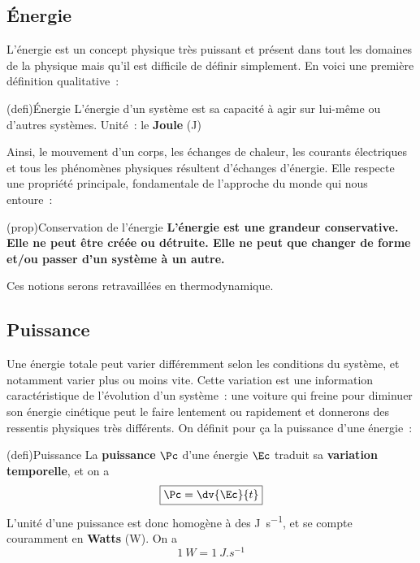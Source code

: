 \documentclass[../../main/main.tex]{subfiles}
\begin{document}
\subsection{Énergie}
L’énergie est un concept physique très puissant et présent dans tout les
domaines de la physique mais qu’il est difficile de définir simplement. En voici
une première définition qualitative~:
\begin{tcb*}[sidebyside, righthand ratio=.3](defi){Énergie}
	L’énergie d’un système est sa capacité à agir sur lui-même ou d’autres
	systèmes.
	\tcblower
	Unité~: le \textbf{Joule} (J)
\end{tcb*}

Ainsi, le mouvement d'un corps, les échanges de chaleur, les courants
électriques et tous les phénomènes physiques résultent d'échanges d'énergie.
Elle respecte une propriété principale, fondamentale de l'approche du monde qui
nous entoure~:

\begin{tcb*}(prop){Conservation de l'énergie}
	\bfseries
	L’énergie est une grandeur conservative. Elle ne peut être créée ou
	détruite. Elle ne peut que changer de forme et/ou passer d’un système à un
	autre.
\end{tcb*}

Ces notions serons retravaillées en thermodynamique.

\vspace{-10pt}
\subsection{Puissance}

Une énergie totale peut varier différemment selon les conditions du système, et
notamment varier plus ou moins vite. Cette variation est une information
caractéristique de l'évolution d'un système~: une voiture qui freine pour
diminuer son énergie cinétique peut le faire lentement ou rapidement et
donnerons des ressentis physiques très différents. On définit pour ça la
puissance d'une énergie~:

\begin{tcb*}[sidebyside](defi){Puissance}
	La \textbf{puissance} $\Pc$ d'une énergie $\Ec$ traduit sa \textbf{variation
		temporelle}, et on a
	\[\boxed{\Pc = \dv{\Ec}{t}}\]
	\tcblower
	L'unité d'une puissance est donc homogène à des \si{J.s^{-1}}, et se compte
	couramment en \textbf{Watts} (W). On a
	\[\boxed{\SI{1}{W} = \SI{1}{J.s^{-1}}}\]
\end{tcb*}
\end{document}
